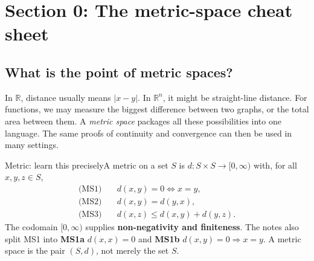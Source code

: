 \documentclass[11pt,a4paper]{article}
\newcommand{\R}{\mathbb R}\newcommand{\N}{\mathbb N}\newcommand{\Z}{\mathbb Z}\newcommand{\Q}{\mathbb Q}\newcommand{\Pow}{\mathcal P}\newcommand{\dd}{\mathrm d}\newcommand{\im}{\operatorname{Ran}}\newcommand{\id}{\operatorname{id}}
\begin{document}
\section{Section 0: The metric-space cheat sheet}
\subsection{What is the point of metric spaces?}
In $\R$, distance usually means $|x-y|$. In $\R^n$, it might be straight-line distance. For functions, we may measure the biggest difference between two graphs, or the total area between them. A \emph{metric space} packages all these possibilities into one language. The same proofs of continuity and convergence can then be used in many settings.
\begin{keybox}{Metric: learn this precisely}A metric on a set $S$ is $d:S\times S\to[0,\infty)$ with, for all $x,y,z\in S$,
\begin{align*} \text{(MS1)}&\quad d(x,y)=0\iff x=y,\\ \text{(MS2)}&\quad d(x,y)=d(y,x),\\ \text{(MS3)}&\quad d(x,z)\le d(x,y)+d(y,z).\end{align*}
The codomain $[0,\infty)$ supplies \textbf{non-negativity and finiteness}. The notes also split MS1 into \textbf{MS1a} $d(x,x)=0$ and \textbf{MS1b} $d(x,y)=0\Rightarrow x=y$. A metric space is the pair $(S,d)$, not merely the set $S$.\end{keybox}
\end{document}
